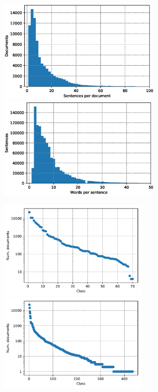 \begin{frame}
  \centering
  \includegraphics[width=0.6\textwidth]{img/sentPerDoc.eps}
  \includegraphics[width=0.6\textwidth]{img/wordPerSent.eps}
\end{frame}

\begin{frame}
  \centering
  \includegraphics[width=0.55\textwidth]{img/classDist-icdo3-site.pdf}
  \includegraphics[width=0.55\textwidth]{img/classDist-icdo3-type.pdf}
\end{frame}

